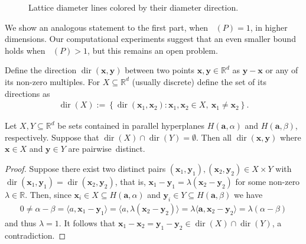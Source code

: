 \documentclass[11pt]{article}
\newcommand{\ba}{\mathbf{a}}
\newcommand{\bx}{\mathbf{x}}
\newcommand{\by}{\mathbf{y}}
\newcommand{\R}{\mathbb{R}}
\newcommand{\Z}{\mathbb{Z}}
\DeclareMathOperator{\dir}{dir}
\DeclareMathOperator{\ldiam}{diam_\Z}
\newcommand{\lb}{\left\{}
\newcommand{\rb}{\right\}}
\begin{document}
\begin{figure}[ht!]
\begin{minipage}{0.48\textwidth}
\end{minipage}

  \caption{Lattice diameter lines colored by their diameter direction.}
  \label{fig:diam-dir}
\end{figure}


We show an analogous statement to the first part, when $\ldiam(P)=1$, in higher dimensions. Our computational experiments suggest that an even smaller bound holds when $\ldiam(P)>1$, but this remains an open problem.

Define the direction $\dir(\bx,\by)$ between two points $\bx,\by \in \R^d$ as $\by-\bx$ or any of its non-zero multiples. For $X \subseteq \R^d$ (usually discrete) define the set of its directions as
\begin{align*}
    \dir(X):= \lb \dir(\bx_1,\bx_2): \bx_1,\bx_2 \in X, \ \bx_1 \neq \bx_2  \rb.
\end{align*}

\begin{lemma}\label{lemma:hyp-dir}
    Let $X,Y \subseteq \R^d$ be sets contained in parallel hyperplanes $H(\ba,\alpha)$ and $ H(\ba,\beta)$, respectively. Suppose that $\dir(X) \cap \dir(Y) = \emptyset$. Then all $\dir(\bx,\by)$ where $\bx \in X$ and $\by \in Y$ are \mbox{pairwise distinct}. 
\end{lemma}

\begin{proof}
    Suppose there exist two distinct pairs $(\bx_1,\by_1), (\bx_2,\by_2) \in X \times Y$ with $\dir(\bx_1,\by_1)=\dir(\bx_2,\by_2)$, that is, $\bx_1-\by_1=\lambda(\bx_2-\by_2)$ for some non-zero $\lambda \in \R$. Then, since $\bx_i \in X \subseteq H(\ba,\alpha)$ and $\by_i \in Y \subseteq H(\ba,\beta)$ we have
    \begin{align*}
        0 \neq \alpha - \beta = \langle a, \bx_1 - \by_1 \rangle = \langle a, \lambda(\bx_2 - \by_2) \rangle 
        = \lambda \langle \ba, \bx_2 - 
        \by_2 \rangle 
        =\lambda (\alpha - \beta)
    \end{align*}
    and thus $\lambda =1$. It follows that $\bx_1-\bx_2 =\by_1-\by_2 \in \dir(X) \cap \dir(Y)$, a contradiction.
\end{proof}
\end{document}
